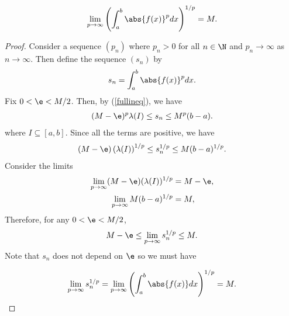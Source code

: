\documentclass{article}
\begin{document}
\begin{claim*}
   \begin{align*}
      \lim_{p\to\infty} \left(\int_a^b \abs{f(x)}^p dx\right)^{1/p} = M.
   \end{align*}
\end{claim*}
\begin{proof}
   Consider a sequence $(p_n)$ where $p_n>0$ for all $n\in\N$ and 
   $p_n\to\infty$ as $n\to\infty$. Then define the sequence $(s_n)$ by
   \begin{align*}
      s_n = \int_a^b \abs{f(x)}^pdx. 
   \end{align*}
   Fix $0<\e<M/2$. Then, by (\ref{fullineq}), we have 
   \begin{align*}
      (M-\e)^p\lambda(I) \leq s_n \leq M^p(b-a).
   \end{align*}
   where $I\subseteq [a,b]$. Since all the terms are positive, we have
   \begin{align*}
      (M-\e)\left(\lambda(I)\right)^{1/p} \leq 
      s_n^{1/p} \leq 
      M(b-a)^{1/p}.
   \end{align*}
   Consider the limits
   \begin{align*}
      \lim_{p\to\infty} (M-\e)(\lambda(I))^{1/p} &= M-\e,\\
      \lim_{p\to\infty} M(b-a)^{1/p} &= M,\\
   \end{align*}
   Therefore, for any $0<\e<M/2$, 
   \begin{align*}
      M-\e \leq \lim_{p\to\infty} s_n^{1/p} \leq M.
   \end{align*}
   Note that $s_n$ does not depend on $\e$ so we must have 

   \begin{align*}
      \lim_{p\to\infty} s_n^{1/p} = \lim_{p\to\infty} \left(\int_a^b \abs{f(x)}dx\right)^{1/p} = M.
   \end{align*}
\end{proof}
\end{document}
